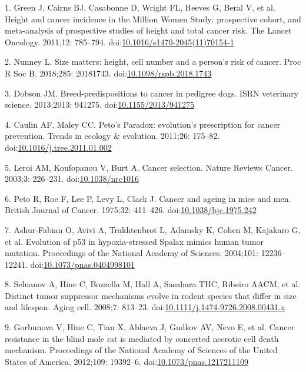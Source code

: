 \documentclass[10pt,letterpaper]{article}
\begin{document}
\hypertarget{refs}{}
\leavevmode\hypertarget{ref-Green2011}{}%
1. Green J, Cairns BJ, Casabonne D, Wright FL, Reeves G, Beral V, et al.
Height and cancer incidence in the Million Women Study: prospective
cohort, and meta-analysis of prospective studies of height and total
cancer risk. The Lancet Oncology. 2011;12: 785--794.
doi:\href{https://doi.org/10.1016/s1470-2045(11)70154-1}{10.1016/s1470-2045(11)70154-1}

\leavevmode\hypertarget{ref-Nunney:20181c2}{}%
2. Nunney L. Size matters: height, cell number and a person's risk of
cancer. Proc R Soc B. 2018;285: 20181743.
doi:\href{https://doi.org/10.1098/rspb.2018.1743}{10.1098/rspb.2018.1743}

\leavevmode\hypertarget{ref-Dobson2013}{}%
3. Dobson JM. Breed-predispositions to cancer in pedigree dogs. ISRN
veterinary science. 2013;2013: 941275.
doi:\href{https://doi.org/10.1155/2013/941275}{10.1155/2013/941275}

\leavevmode\hypertarget{ref-CaulinAndMaley2011}{}%
4. Caulin AF, Maley CC. Peto's Paradox: evolution's prescription for
cancer prevention. Trends in ecology \& evolution. 2011;26: 175--82.
doi:\href{https://doi.org/10.1016/j.tree.2011.01.002}{10.1016/j.tree.2011.01.002}

\leavevmode\hypertarget{ref-Leroi2003}{}%
5. Leroi AM, Koufopanou V, Burt A. Cancer selection. Nature Reviews
Cancer. 2003;3: 226--231.
doi:\href{https://doi.org/10.1038/nrc1016}{10.1038/nrc1016}

\leavevmode\hypertarget{ref-Peto1975}{}%
6. Peto R, Roe F, Lee P, Levy L, Clack J. Cancer and ageing in mice and
men. British Journal of Cancer. 1975;32: 411--426.
doi:\href{https://doi.org/10.1038/bjc.1975.242}{10.1038/bjc.1975.242}

\leavevmode\hypertarget{ref-Ashur-Fabian2004}{}%
7. Ashur-Fabian O, Avivi A, Trakhtenbrot L, Adamsky K, Cohen M, Kajakaro
G, et al. Evolution of p53 in hypoxia-stressed Spalax mimics human tumor
mutation. Proceedings of the National Academy of Sciences. 2004;101:
12236--12241.
doi:\href{https://doi.org/10.1073/pnas.0404998101}{10.1073/pnas.0404998101}

\leavevmode\hypertarget{ref-Seluanov2008}{}%
8. Seluanov A, Hine C, Bozzella M, Hall A, Sasahara THC, Ribeiro AACM,
et al. Distinct tumor suppressor mechanisms evolve in rodent species
that differ in size and lifespan. Aging cell. 2008;7: 813--23.
doi:\href{https://doi.org/10.1111/j.1474-9726.2008.00431.x}{10.1111/j.1474-9726.2008.00431.x}

\leavevmode\hypertarget{ref-Gorbunova2012}{}%
9. Gorbunova V, Hine C, Tian X, Ablaeva J, Gudkov AV, Nevo E, et al.
Cancer resistance in the blind mole rat is mediated by concerted
necrotic cell death mechanism. Proceedings of the National Academy of
Sciences of the United States of America. 2012;109: 19392--6.
doi:\href{https://doi.org/10.1073/pnas.1217211109}{10.1073/pnas.1217211109}
\end{document}
